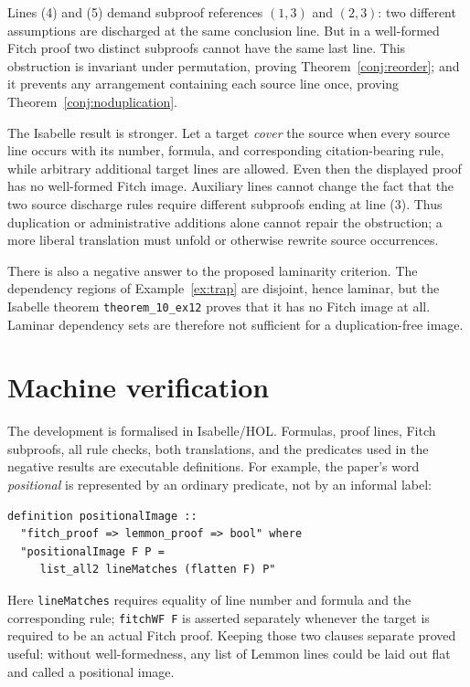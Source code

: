 \documentclass[11pt]{article}
\theoremstyle{plain}
\theoremstyle{definition}
\theoremstyle{remark}
\begin{document}
\noindent Lines (4) and (5) demand subproof references $(1,3)$ and $(2,3)$:
two different assumptions are discharged at the same conclusion line. But in
a well-formed Fitch proof two distinct subproofs cannot have the same last
line. This obstruction is invariant under permutation, proving
Theorem~\ref{conj:reorder}; and it prevents any arrangement containing each
source line once, proving Theorem~\ref{conj:noduplication}.

The Isabelle result is stronger. Let a target \emph{cover} the source when
every source line occurs with its number, formula, and corresponding
citation-bearing rule, while arbitrary additional target lines are allowed.
Even then the displayed proof has no well-formed Fitch image. Auxiliary lines
cannot change the fact that the two source discharge rules require different
subproofs ending at line (3). Thus duplication or administrative additions
alone cannot repair the obstruction; a more liberal translation must unfold
or otherwise rewrite source occurrences.

There is also a negative answer to the proposed laminarity criterion. The
dependency regions of Example~\ref{ex:trap} are disjoint, hence laminar, but
the Isabelle theorem \verb|theorem_10_ex12| proves that it has no Fitch image
at all. Laminar dependency sets are therefore not sufficient for a
duplication-free image.

\section{Machine verification}\label{sec:machine}

The development is formalised in Isabelle/HOL. Formulas, proof lines, Fitch
subproofs, all rule checks, both translations, and the predicates used in the
negative results are executable definitions. For example, the paper's word
\emph{positional} is represented by an ordinary predicate, not by an informal
label:

\begin{lstlisting}[language={}]
definition positionalImage ::
  "fitch_proof => lemmon_proof => bool" where
  "positionalImage F P =
     list_all2 lineMatches (flatten F) P"
\end{lstlisting}

\noindent Here \verb|lineMatches| requires equality of line number and formula
and the corresponding rule; \verb|fitchWF F| is asserted separately whenever
the target is required to be an actual Fitch proof. Keeping those two clauses
separate proved useful: without well-formedness, any list of Lemmon lines could
be laid out flat and called a positional image.
\end{document}
